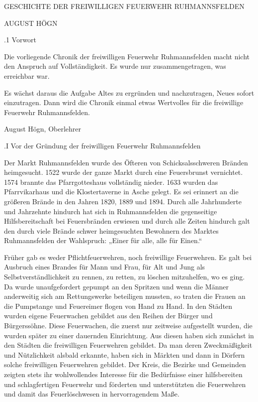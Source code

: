 GESCHICHTE DER FREIWILLIGEN FEUERWEHR RUHMANNSFELDEN



AUGUST HÖGN

.1 Vorwort

Die vorliegende Chronik der freiwilligen Feuerwehr Ruhmannsfelden macht nicht
den Anspruch auf Vollständigkeit. Es wurde nur zusammengetragen, was erreichbar
war.

Es wächst daraus die Aufgabe Altes zu ergründen und nachzutragen, Neues sofort
einzutragen. Dann wird die Chronik einmal etwas Wertvolles für die freiwillige
Feuerwehr Ruhmannsfelden.



August Högn, Oberlehrer

.I Vor der Gründung der freiwilligen Feuerwehr Ruhmannsfelden

Der Markt Ruhmannsfelden wurde des Öfteren von Schicksalsschweren Bränden
heimgesucht. 1522 wurde der ganze Markt durch eine Feuersbrunst vernichtet. 1574
brannte das Pfarrgotteshaus vollständig nieder. 1633 wurden das Pfarrvikarhaus
und die Klostertaverne in Asche gelegt. Es sei erinnert an die größeren Brände
in den Jahren 1820, 1889 und 1894. Durch alle Jahrhunderte und Jahrzehnte
hindurch hat sich in Ruhmannsfelden die gegenseitige Hilfsbereitschaft bei
Feuersbränden erwiesen und durch alle Zeiten hindurch galt den durch viele
Brände schwer heimgesuchten Bewohnern des Marktes Ruhmannsfelden der Wahlspruch:
„Einer für alle, alle für Einen.“

Früher gab es weder Pflichtfeuerwehren, noch freiwillige Feuerwehren. Es galt
bei Ausbruch eines Brandes für Mann und Frau, für Alt und Jung als
Selbstverständlichkeit zu rennen, zu retten, zu löschen mitzuhelfen, wo es ging.
Da wurde unaufgefordert gepumpt an den Spritzen und wenn die Männer anderweitig
sich am Rettungswerke beteiligen mussten, so traten die Frauen an die Pumpstange
und Feuereimer flogen von Hand zu Hand. In den Städten wurden eigene Feuerwachen
gebildet aus den Reihen der Bürger und Bürgerssöhne. Diese Feuerwachen, die
zuerst nur zeitweise aufgestellt wurden, die wurden später zu einer dauernden
Einrichtung. Aus diesen haben sich zunächst in den Städten die freiwilligen
Feuerwehren gebildet. Da man deren Zweckmäßigkeit und Nützlichkeit alsbald
erkannte, haben sich in Märkten und dann in Dörfern solche freiwilligen
Feuerwehren gebildet. Der Kreis, die Bezirke und Gemeinden zeigten stets ihr
wohlwollendes Interesse für die Bedürfnisse einer hilfsbereiten und
schlagfertigen Feuerwehr und förderten und unterstützten die Feuerwehren und
damit das Feuerlöschwesen in hervorragendem Maße.

